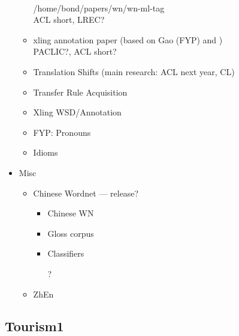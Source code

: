 \documentclass[12pt]{book} %
\begin{document}
\begin{CJK}{UTF8}{gbsn}
\begin{itemize}
\begin{itemize}
    \\ /home/bond/papers/wn/wn-ml-tag
    \\ ACL short, LREC?
  \item xling annotation paper (based on Gao (FYP) and \citet{Mok:2012})
    \\ PACLIC?, ACL short?
\item Translation Shifts (main research: ACL next year, CL)
\item Transfer Rule Acquisition
\item Xling WSD/Annotation
\item FYP: Pronouns
\item Idioms
  \end{itemize}
\item Misc
  \begin{itemize}
  \item Chinese Wordnet --- release?
    \begin{itemize}
    \item Chinese WN
    \item Gloss corpus
    \item Classifiers
    \item[?]
    \end{itemize}
  \item ZhEn 
  \end{itemize}

\end{itemize}


\subsection{Tourism1}


\end{CJK}
\end{document}
